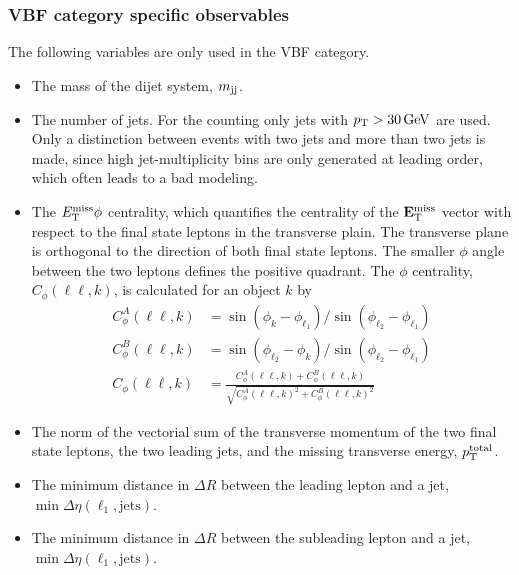 \subsubsection{VBF category specific observables}
The following variables are only used in the VBF category.
\begin{itemize}
    \item The mass of the dijet system, $m_{\text{jj}}$.
    \item The number of jets. For the counting only jets with $\pt > \SI{30}{\GeV}$ are used.
          Only a distinction between events with two jets and more than two jets is made, since high jet-multiplicity bins
          are only generated at leading order, which often leads to a bad modeling.
    \item The $E_\text{T}^\text{miss} \phi$ centrality, which quantifies the centrality of the $\mathbf{E}_\text{T}^\text{miss}$ vector with respect to the final
          state leptons in the transverse plain.
          The transverse plane is orthogonal to the direction of both final state leptons. The smaller $\phi$ angle between
          the two leptons defines the positive quadrant.
          The $\phi$ centrality, $C_\phi(\ell\ell,k)$, is calculated for an object $k$ by~\cite{SchilloPhd}
          \begin{align}
              C_\phi^A(\ell\ell,k) &= \sin(\phi_k - \phi_{\ell_1}) / \sin(\phi_{\ell_2} - \phi_{\ell_1}) \\
              C_\phi^B(\ell\ell,k) &= \sin(\phi_{\ell_2} - \phi_k) / \sin(\phi_{\ell_2} - \phi_{\ell_1}) \\
              C_\phi(\ell\ell,k) &=  \frac{C_\phi^A(\ell\ell,k) + C_\phi^B(\ell\ell,k)}{\sqrt{C_\phi^A{(\ell\ell,k)}^2 + C_\phi^B{(\ell\ell,k)}^2}}
          \end{align}
    \item The norm of the vectorial sum of the transverse momentum of the two final state leptons, the two leading jets, and the missing transverse energy, $p_\text{T}^\text{total}$.
    \item The minimum distance in $\Delta R$ between the leading lepton and a jet, $\min \Delta \eta (\ell_1, \text{jets})$.
    \item The minimum distance in $\Delta R$ between the subleading lepton and a jet, $\min \Delta \eta (\ell_1, \text{jets})$.
\end{itemize}

